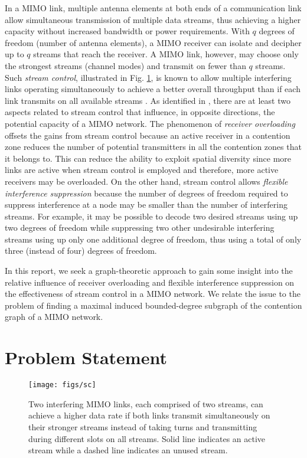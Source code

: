 \documentclass[journal,12pt,onecolumn]{IEEEtran}
\begin{document}
In a MIMO link, multiple antenna elements at both ends of a communication
link allow simultaneous transmission of multiple data streams, thus
achieving a higher capacity without increased bandwidth or power
requirements. With $q$ degrees of freedom (number of antenna
elements), a MIMO receiver can isolate and decipher up to $q$ streams
that reach the receiver. A MIMO link, however, may choose only the
strongest streams (channel modes) and transmit on fewer than $q$
streams. Such {\em stream control}, illustrated in Fig.\,\,\ref{fig:sc}, is known to allow multiple 
interfering links operating simultaneously to achieve a better overall
throughput than if each link transmits on all 
available streams \cite{DemIng2003,BluWin2002}. As identified in
\cite{SunSiv2004}, there are at least two aspects 
related to stream control that influence, in opposite directions, the
potential capacity of a MIMO network. The phenomenon of {\em receiver
  overloading} offsets the gains from stream control because an active
receiver in a contention zone reduces the number of
potential transmitters in all the contention zones that it belongs
to. This can reduce the ability to exploit spatial diversity since more links are active when stream
control is employed and therefore, more active receivers may be
overloaded. On the other hand, stream control allows {\em flexible 
  interference suppression} because the number of degrees of freedom
required to suppress interference at a node may be smaller than the
number of interfering streams. For example, it may be possible to
decode two desired streams using up two degrees of freedom while
suppressing two other undesirable interfering streams using up only
one additional degree of freedom, thus using a total of only three
(instead of four) degrees of freedom. 

In this report, we seek a graph-theoretic approach to gain some
insight into the relative influence of receiver overloading and
flexible interference suppression on the effectiveness of stream
control in a MIMO network. We relate the issue to the problem of
finding a maximal induced bounded-degree subgraph of the contention
graph of a MIMO network.

\section{Problem Statement}
\label{sec:problem}

\begin{figure}[!t]
\begin{center}
\texttt{[image: figs/sc]}
\caption{Two interfering MIMO links, each comprised of two streams, can achieve a higher data 
rate if both links transmit simultaneously on their stronger
streams instead of taking turns and transmitting during different
slots on all streams. Solid line indicates an active stream while a
dashed line indicates an unused stream.} 
\label{fig:sc}
\end{center}
\end{figure}
\end{document}
